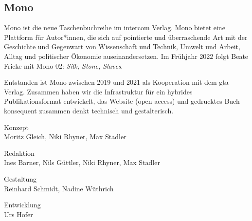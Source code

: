 \documentclass[%
	fontsize=10pt,%
	twoside,%
	headings=optiontoheadandtoc,%
	showtrims]{scrbook}
\newcommand{\antiqua}[3]{%
	\fontsize{#1}{#2}%
	\Lyon%
	\addfontfeature{LetterSpace=#3}%
	\selectfont%
}
\newcommand{\smallfontantiqua}{%
	\normalfont%
	\antiqua{7bp}{8.5bp}{.15}%
}
\newcommand{\smallfontdefault}{%
	\smallfontantiqua%
}
\begin{document}
%
%
\smallfontdefault%
\raggedcolumns%
\begin{multicols*}{2}%
	\RaggedRight%
			\subsection*{Mono}%
			\vspace{-1.25em}%
		\par Mono ist die neue Taschenbuchreihe im intercom Verlag. Mono bietet eine Plattform für Autor*innen, die sich auf pointierte und überraschende Art mit der Geschichte und Gegenwart von Wissenschaft und Technik, Umwelt und Arbeit, Alltag und politischer Ökonomie auseinandersetzen. Im Frühjahr 2022 folgt Beate Fricke mit Mono 02: \emph{Silk, Stone, Slaves}. \par Entstanden ist Mono zwischen 2019 und 2021 als Kooperation mit dem gta Verlag. Zusammen haben wir die Infrastruktur für ein hybrides Publikationsformat entwickelt, das Website (open access) und gedrucktes Buch konsequent zusammen denkt \textendash{} technisch und gestalterisch.\par Konzept\\ Moritz Gleich, Niki Rhyner, Max Stadler\par Redaktion\\ Ines Barner, Nils Güttler, Niki Rhyner, Max Stadler\par Gestaltung\\ Reinhard Schmidt, Nadine Wüthrich\par Entwicklung\\ Urs Hofer%
		\vfill%
			\null%
		\columnbreak%

\end{multicols*}
\end{document}
